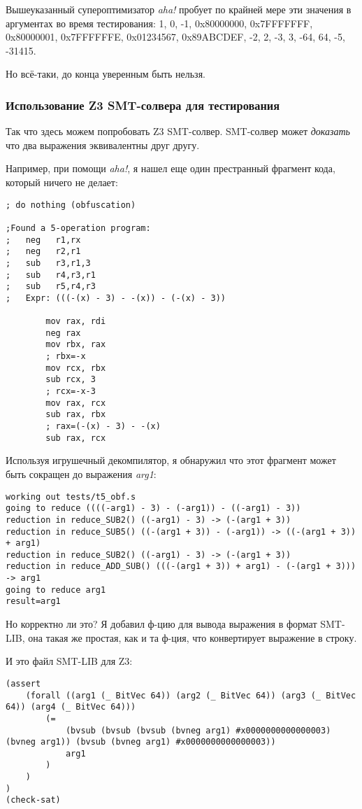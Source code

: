 Вышеуказанный супероптимизатор \textit{aha!} пробует по крайней мере эти значения в аргументах во время тестирования:
1, 0, -1, 0x80000000, 0x7FFFFFFF, 0x80000001, 0x7FFFFFFE, 0x01234567, 0x89ABCDEF, -2, 2, -3, 3,
-64, 64, -5, -31415.

Но всё-таки, до конца уверенным быть нельзя.

\subsubsection{Использование Z3 \ac{SMT}-солвера для тестирования}

Так что здесь можем попробовать Z3 \ac{SMT}-солвер.
SMT-солвер может \textit{доказать} что два выражения эквивалентны друг другу.

Например, при помощи \textit{aha!}, я нашел еще один престранный фрагмент кода, который ничего не делает:

\begin{lstlisting}
; do nothing (obfuscation)

;Found a 5-operation program:
;   neg   r1,rx
;   neg   r2,r1
;   sub   r3,r1,3
;   sub   r4,r3,r1
;   sub   r5,r4,r3
;   Expr: (((-(x) - 3) - -(x)) - (-(x) - 3))

        mov rax, rdi
        neg rax
        mov rbx, rax
        ; rbx=-x
        mov rcx, rbx
        sub rcx, 3
        ; rcx=-x-3
        mov rax, rcx
        sub rax, rbx
        ; rax=(-(x) - 3) - -(x)
        sub rax, rcx
\end{lstlisting}

Используя игрушечный декомпилятор, я обнаружил что этот фрагмент может быть сокращен до выражения \textit{arg1}:

\begin{lstlisting}
working out tests/t5_obf.s
going to reduce ((((-arg1) - 3) - (-arg1)) - ((-arg1) - 3))
reduction in reduce_SUB2() ((-arg1) - 3) -> (-(arg1 + 3))
reduction in reduce_SUB5() ((-(arg1 + 3)) - (-arg1)) -> ((-(arg1 + 3)) + arg1)
reduction in reduce_SUB2() ((-arg1) - 3) -> (-(arg1 + 3))
reduction in reduce_ADD_SUB() (((-(arg1 + 3)) + arg1) - (-(arg1 + 3))) -> arg1
going to reduce arg1
result=arg1
\end{lstlisting}

Но корректно ли это?
Я добавил ф-цию для вывода выражения в формат SMT-LIB, она такая же простая, как и та ф-ция, что конвертирует
выражение в строку.

И это файл SMT-LIB для Z3:

\begin{lstlisting}
(assert
    (forall ((arg1 (_ BitVec 64)) (arg2 (_ BitVec 64)) (arg3 (_ BitVec 64)) (arg4 (_ BitVec 64)))
        (=
            (bvsub (bvsub (bvsub (bvneg arg1) #x0000000000000003) (bvneg arg1)) (bvsub (bvneg arg1) #x0000000000000003))
            arg1
        )
    )
)
(check-sat)
\end{lstlisting}


